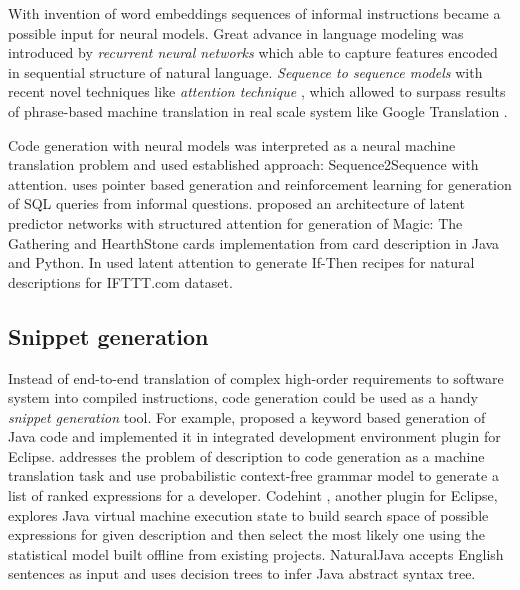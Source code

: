 With invention of word embeddings \parencite{bengio2003neural} sequences of informal instructions became a possible input for neural models. Great advance in language modeling was introduced by \emph{recurrent neural networks} \parencite{sundermeyer2012lstm, hochreiter1997long, Jozefowicz2016, Gers2001} which able to capture features encoded in sequential structure of natural language. \emph{Sequence to sequence models} \parencite{NIPS2014_5346} with recent novel techniques like \emph{attention technique} \parencite{Luong2015, Jean2014, Bahdanau2014}, which allowed to surpass results of phrase-based machine translation in real scale system like Google Translation \parencite{Wu2016}.

Code generation with neural models was interpreted as a neural machine translation problem and used established approach: Sequence2Sequence with attention. \cite{Zhong2017} uses pointer based generation and reinforcement learning for generation of SQL queries from informal questions. \cite{Ling2016} proposed an architecture of latent predictor networks with structured attention for generation of Magic: The Gathering and HearthStone cards implementation from card description in Java and Python. In \cite{Chen2016} used latent attention to generate If-Then recipes for natural descriptions for IFTTT.com dataset.

\subsection{Snippet generation}
Instead of end-to-end translation of complex high-order requirements to software system into compiled instructions, code generation could be used as a handy \emph{snippet generation} tool. For example, \cite{little2009keyword} proposed a keyword based generation of Java code and implemented it in integrated development environment plugin for Eclipse. \cite{Gvero2015} addresses the problem of description to code generation as a machine translation task and use probabilistic context-free grammar model to generate a list of ranked expressions for a developer. Codehint \parencite{Galenson2014}, another plugin for Eclipse, explores Java virtual machine execution state to build search space of possible expressions for given description and then select the most likely one using the statistical model built offline from existing projects. NaturalJava \parencite{Price2000} accepts English sentences as input and uses decision trees to infer Java abstract syntax tree.

